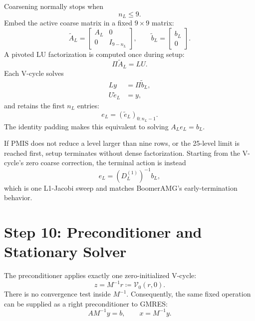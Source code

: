 \documentclass[11pt]{article}
\begin{document}
Coarsening normally stops when
\begin{equation}
  n_L\leq 9.
  \label{eq:coarse-size}
\end{equation}
Embed the active coarse matrix in a fixed $9\times9$ matrix:
\begin{equation}
  \widetilde A_L
  =
  \begin{bmatrix}
    A_L & 0\\
    0   & I_{9-n_L}
  \end{bmatrix},
  \qquad
  \widetilde b_L
  =
  \begin{bmatrix}
    b_L\\
    0
  \end{bmatrix}.
  \label{eq:padded-coarse-system}
\end{equation}
A pivoted LU factorization is computed once during setup:
\begin{equation}
  \Pi\widetilde A_L=LU.
  \label{eq:coarse-lu}
\end{equation}
Each V-cycle solves
\begin{align}
  Ly &= \Pi\widetilde b_L,
  \label{eq:coarse-forward}\\
  U\widetilde e_L &= y,
  \label{eq:coarse-backward}
\end{align}
and retains the first $n_L$ entries:
\begin{equation}
  e_L
  =
  \left(\widetilde e_L\right)_{0:n_L-1}.
  \label{eq:coarse-active-solution}
\end{equation}
The identity padding makes this equivalent to solving $A_Le_L=b_L$.

If PMIS does not reduce a level larger than nine rows, or the 25-level limit
is reached first, setup terminates without dense factorization.  Starting from
the V-cycle's zero coarse correction, the terminal action is instead
\begin{equation}
  e_L=\left(D_L^{(1)}\right)^{-1}b_L,
  \label{eq:terminal-l1-jacobi}
\end{equation}
which is one L1-Jacobi sweep and matches BoomerAMG's early-termination
behavior.

\section{Step 10: Preconditioner and Stationary Solver}

The preconditioner applies exactly one zero-initialized V-cycle:
\begin{equation}
  z=M^{-1}r
  \coloneqq
  \mathcal V_0(r,0).
  \label{eq:preconditioner-apply}
\end{equation}
There is no convergence test inside $M^{-1}$.  Consequently, the same fixed
operation can be supplied as a right preconditioner to GMRES:
\begin{equation}
  AM^{-1}y=b,
  \qquad
  x=M^{-1}y.
  \label{eq:right-preconditioned-system}
\end{equation}
\end{document}
